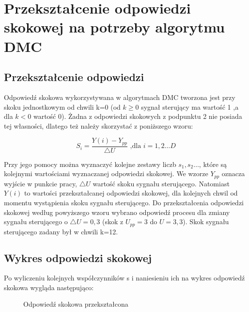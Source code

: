 \chapter{Przekształcenie odpowiedzi skokowej na potrzeby algorytmu DMC}

\section{Przekształcenie odpowiedzi}
Odpowiedź skokowa wykorzystywana w algorytmach DMC tworzona jest przy skoku jednostkowym od chwili k=0 (od $k\geq0$ sygnał sterujący ma wartość 1 ,a dla $k<0$  wartość 0).
Żadna z odpowiedzi skokowych z podpunktu 2 nie posiada tej własności, dlatego też należy skorzystać z poniższego wzoru:

\begin{equation}
S_i=\frac{Y(i)-Y_{pp}}{\triangle U} \textrm{ ,dla } i=1,2 \ldots D
\label{step_norm}
\end{equation}

Przy jego pomocy można wyznaczyć kolejne zestawy liczb $s_1, s_2  \ldots$, które są kolejnymi wartościami wyznaczanej odpowiedzi skokowej. We wzorze $Y_{pp}$ oznacza wyjście w punkcie pracy, $\triangle U$ wartość skoku sygnału sterującego. Natomiast $Y(i)$ to wartości przekształcanej odpowiedzi skokowej, dla kolejnych chwil od momentu wystąpienia skoku sygnału sterującego.
Do przekształcenia odpowiedzi skokowej według powyższego wzoru wybrano odpowiedź procesu dla zmiany sygnału sterującego o $\triangle U=0,3$ (skok z $U_{pp}=3$ do $U=3,3$). Skok sygnału sterującego zadany był w chwili k=12.


\section{Wykres odpowiedzi skokowej}
Po wyliczeniu kolejnych współczynników s i naniesieniu ich na wykres odpowiedź skokowa wygląda następująco:


\begin{figure}[H]
\centering

\caption{Odpowiedź skokowa przekształcona}
\end{figure}

